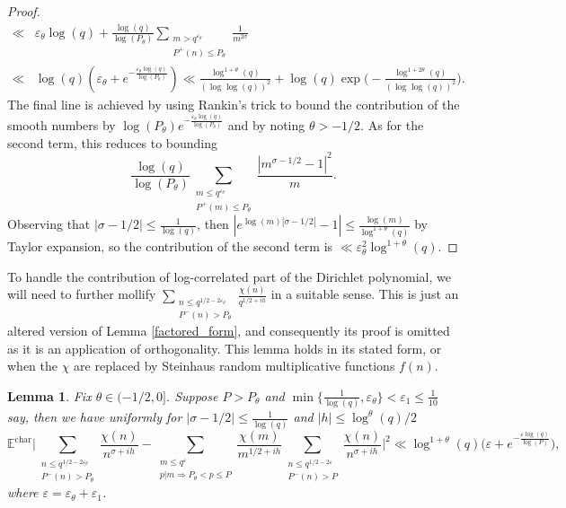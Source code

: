 \documentclass[reqno]{amsart}
\newtheorem{lemma}{Lemma}
\theoremstyle{definition}
\theoremstyle{remark}
\numberwithin{equation}{section}
\theoremstyle{remark}
\begin{document}
\begin{proof}
\begin{align*}
        \ll& \varepsilon_\theta\log(q) + \frac{\log(q)}{\log(P_\theta)}\sum_{\substack{ m > q^{\varepsilon_\theta} \\ P^+(n) \leq P_\theta}}\frac{1}{m^{2\sigma}} \\ \ll& \log(q)(\varepsilon_\theta+e^{-\frac{\varepsilon_\theta\log(q)}{\log(P_\theta)}}) \ll \frac{\log^{1+\theta}(q)}{(\log\log(q))^2} + \log(q)\exp\big(-\frac{\log^{1+2\theta}(q)}{(\log\log(q))^2}\big).
    \end{align*}
    The final line is achieved by using Rankin's trick to bound the contribution of the smooth numbers by $\log(P_\theta)e^{-\frac{\varepsilon_\theta\log(q)}{\log(P_\theta)}}$ and by noting $\theta > -1/2$. As for the second term, this reduces to bounding
    $$\frac{\log(q)}{\log(P_\theta)}\sum_{\substack{m \leq q^{\varepsilon_\theta} \\ P^+(m) \leq P_\theta}}\frac{|m^{\sigma-1/2}-1|^2}{m}.$$
    Observing that $|\sigma-1/2| \leq \frac{1}{\log(q)}$, then $|e^{\log(m)|\sigma-1/2|}-1| \leq \frac{\log(m)}{\log^{1+\theta}(q)}$ by Taylor expansion, so the contribution of the second term is $\ll \varepsilon_\theta^2\log^{1+\theta}(q)$.
\end{proof}
To handle the contribution of log-correlated part of the Dirichlet polynomial, we will need to further mollify $\sum_{\substack{n \leq q^{1/2-2\varepsilon_\theta} \\ P^{-}(n) > P_\theta}}\frac{\chi(n)}{q^{1/2+ih}}$ in a suitable sense. This is just an altered version of Lemma \ref{factored_form}, and consequently its proof is omitted as it is an application of orthogonality. This lemma holds in its stated form, or when the $\chi$ are replaced by Steinhaus random multiplicative functions $f(n)$.
\begin{lemma}
    Fix $\theta \in (-1/2,0]$. Suppose $P > P_\theta$ and $\min\{\frac{1}{\log(q)},\varepsilon_\theta\} < \varepsilon_1 \leq \frac{1}{10}$ say, then we have uniformly for $|\sigma-1/2| \leq \frac{1}{\log(q)}$ and $|h| \leq \log^{\theta}(q)/2$
    \begin{equation*}
    \mathbb{E}^{\text{char}}\big|\sum_{\substack{n \leq q^{1/2-2\varepsilon_\theta} \\ P^{-}(n) >P_\theta}}\frac{\chi(n)}{n^{\sigma+ih}}-\sum_{\substack{m \leq q^{\varepsilon} \\ p|m \Rightarrow P_\theta < p \leq P}}\frac{\chi(m)}{m^{1/2+ih}}\sum_{\substack{n \leq q^{1/2-2\varepsilon} \\ P^{-}(n) > P}}\frac{\chi(n)}{n^{\sigma+ih}}\big|^2 \ll \log^{1+\theta}(q)\big(\varepsilon+e^{-\frac{\varepsilon\log(q)}{\log(P)}}\big),
    \end{equation*}
    where $\varepsilon = \varepsilon_\theta+\varepsilon_1$. \label{logcor_factored_form}
\end{lemma}
\end{document}
